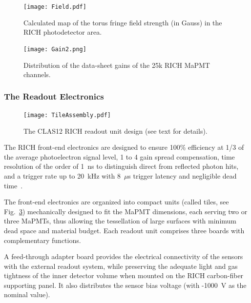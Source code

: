 \documentclass[5p,times,twocolumn]{elsarticle}
\begin{document}
\begin{figure}[t]
\begin{center}
\texttt{[image: Field.pdf]}
\end{center}
\caption{Calculated map of the torus fringe field strength (in Gauss) in the RICH photodetector area.}
\label{fig:MagFringe}
\end{figure}

\begin{figure}[t]
\begin{center}
\texttt{[image: Gain2.png]}
\end{center}
\caption{Distribution of the data-sheet gains of the 25k RICH MaPMT channels.}
\label{fig:MaPMTGain}
\end{figure}

\subsubsection{The Readout Electronics}

\begin{figure}[t]
\begin{center}
\texttt{[image: TileAssembly.pdf]}
\end{center}
\caption{The CLAS12 RICH readout unit design (see text for details).}
\label{fig:EleTile}
\end{figure}

The RICH front-end electronics are designed to ensure 100\% efficiency at 1/3 of the average photoelectron signal level, 1 to 4 gain spread compensation, time resolution of the order of 1~ns to distinguish direct from reflected photon hits, and a trigger rate up to 20~kHz with 8~$\mu$s trigger latency and negligible dead time~\cite{Ref:RICHElectro}.

The front-end electronics are organized into compact units (called tiles, see Fig.~\ref{fig:EleTile}) mechanically designed to
fit the MaPMT dimensions, each serving two or three MaPMTs, thus allowing the tessellation of large surfaces with
minimum dead space and material budget. Each readout unit comprises three boards with complementary functions.

A feed-through adapter board provides the electrical connectivity of the sensors with the external readout
system, while preserving the adequate light and gas tightness of the inner detector volume when mounted on the RICH
carbon-fiber supporting panel. It also distributes the sensor bias voltage (with -1000~V as the nominal value).
\end{document}
